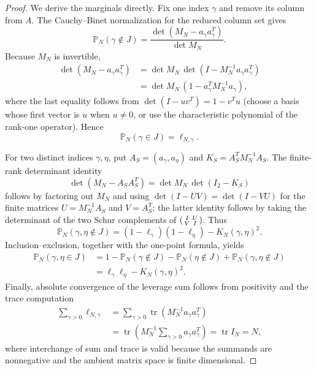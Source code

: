 \documentclass[preprint,12pt]{elsarticle}
\numberwithin{equation}{section}
\theoremstyle{plain}
\theoremstyle{definition}
\theoremstyle{remark}
\begin{document}
\begin{proof}
We derive the marginals directly.  Fix one index $\gamma$ and remove its column from $A$.  The Cauchy--Binet normalization for the reduced column set gives
\begin{equation}
\mathbb P_N(\gamma\notin J)
=\frac{\det(M_N-a_\gamma a_\gamma^T)}{\det M_N}.
\end{equation}
Because $M_N$ is invertible,
\begin{align}
\det(M_N-a_\gamma a_\gamma^T)
&=\det M_N\,\det(I-M_N^{-1}a_\gamma a_\gamma^T)\\
&=\det M_N\,(1-a_\gamma^TM_N^{-1}a_\gamma),
\end{align}
where the last equality follows from $\det(I-uv^T)=1-v^Tu$ (choose a basis whose first vector is $u$ when $u\ne0$, or use the characteristic polynomial of the rank-one operator).  Hence
\begin{equation}
\mathbb P_N(\gamma\in J)=\ell_{N,\gamma}.
\end{equation}

For two distinct indices $\gamma,\eta$, put $A_S=(a_\gamma,a_\eta)$ and
$K_S=A_S^TM_N^{-1}A_S$.  The finite-rank determinant identity
\begin{equation}
\det(M_N-A_SA_S^T)=\det M_N\,\det(I_2-K_S)
\end{equation}
follows by factoring out $M_N$ and using $\det(I-UV)=\det(I-VU)$ for the finite matrices $U=M_N^{-1}A_S$ and $V=A_S^T$; the latter identity follows by taking the determinant of the two Schur complements of
$\begin{psmallmatrix}I&U\\V&I\end{psmallmatrix}$.  Thus
\begin{equation}
\mathbb P_N(\gamma,\eta\notin J)
=(1-\ell_\gamma)(1-\ell_\eta)-K_N(\gamma,\eta)^2.
\end{equation}
Inclusion--exclusion, together with the one-point formula, yields
\begin{align}
\mathbb P_N(\gamma,\eta\in J)
&=1-\mathbb P_N(\gamma\notin J)-\mathbb P_N(\eta\notin J)
+\mathbb P_N(\gamma,\eta\notin J)\\
&=\ell_\gamma\ell_\eta-K_N(\gamma,\eta)^2.
\end{align}
Finally, absolute convergence of the leverage sum follows from positivity and the trace computation
\begin{align}
\sum_{\gamma>0}\ell_{N,\gamma}
&=\sum_{\gamma>0}\operatorname{tr}(M_N^{-1}a_\gamma a_\gamma^T)\\
&=\operatorname{tr}\left(M_N^{-1}\sum_{\gamma>0}a_\gamma a_\gamma^T\right)
=\operatorname{tr}I_N=N,
\end{align}
where interchange of sum and trace is valid because the summands are nonnegative and the ambient matrix space is finite dimensional.
\end{proof}
\end{document}
